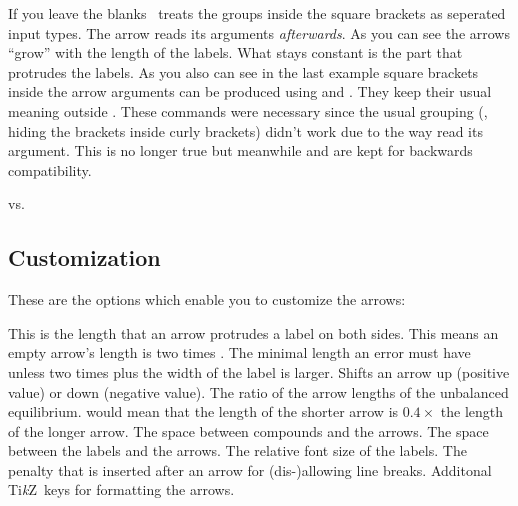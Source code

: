 \documentclass[load-preamble+]{cnltx-doc}
\newcommand*\TikZ{Ti\textit{k}Z}
\begin{document}
If you leave the blanks \chemformula\ treats the groups inside the square
brackets as seperated input types.  The arrow reads its arguments
\emph{afterwards}.  As you can see the arrows \enquote{grow} with the length
of the labels.  What stays constant is the part that protrudes the labels.  As
you also can see in the last example square brackets inside the arrow
arguments can be produced using \cs*{[} and \cs*{]}.  They keep their usual
meaning outside .  These commands were necessary since the usual
grouping (\ie, hiding the brackets inside curly brackets) didn't work due to
the way  read its argument.  This is no longer true but meanwhile
\cs*{[} and \cs*{]} are kept for backwards compatibility.
\begin{example}
   \par
   \par
   \par
   \par
  \setatomsep{15pt}
   \par
   vs. 
\end{example}

\subsection{Customization}
These are the options which enable you to customize the arrows:
\begin{options}
  \Default{.75em}
    This is the length that an arrow protrudes a label on both sides.  This
    means an empty arrow's length is two times .
  \Default{0pt}
    The minimal length an error must have unless two times
     plus the width of the label is larger.
  \Default{0pt}
    Shifts an arrow up (positive value) or down (negative value).
    The ratio of the arrow lengths of the unbalanced equilibrium.  
    would mean that the length of the shorter arrow is $0.4\times$ the length
    of the longer arrow.
  \Default{.5em}
    The space between compounds and the arrows.
  \Default{2pt}
    The space between the labels and the arrows.
    The relative font size of the labels.
    The penalty that is inserted after an arrow for
    (dis-)allowing line breaks.
  \keyval{arrow-style}{\TikZ}\Default
    Additonal \TikZ\ keys for formatting the arrows.
\end{options}
\end{document}
